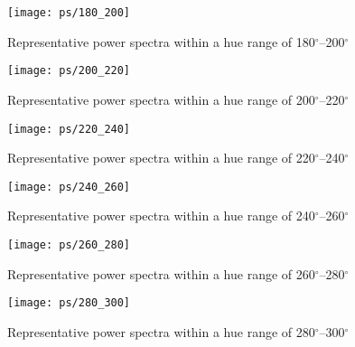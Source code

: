 \begin{figure}[p]
	{\vspace*{-0.5cm}\hspace*{-1.5cm}\texttt{[image: ps/180\_200]}}
	\caption[Power spectra with a hue of 180$^\circ$--200$^\circ$]{Representative power spectra within a hue range of 180$^\circ$--200$^\circ$}\label{fig:ps_180_200}
\end{figure}

\begin{figure}[p]
	{\vspace*{-0.5cm}\hspace*{-1.5cm}\texttt{[image: ps/200\_220]}}
	\caption[Power spectra with a hue of 200$^\circ$--220$^\circ$]{Representative power spectra within a hue range of 200$^\circ$--220$^\circ$}\label{fig:ps_200_220}
\end{figure}

\begin{figure}[p]
	{\vspace*{-0.5cm}\hspace*{-1.5cm}\texttt{[image: ps/220\_240]}}
	\caption[Power spectra with a hue of 220$^\circ$--240$^\circ$]{Representative power spectra within a hue range of 220$^\circ$--240$^\circ$}\label{fig:ps_220_240}
\end{figure}

\begin{figure}[p]
	{\vspace*{-0.5cm}\hspace*{-1.5cm}\texttt{[image: ps/240\_260]}}
	\caption[Power spectra with a hue of 240$^\circ$--260$^\circ$]{Representative power spectra within a hue range of 240$^\circ$--260$^\circ$}\label{fig:ps_240_260}
\end{figure}

\begin{figure}[p]
	{\vspace*{-0.5cm}\hspace*{-1.5cm}\texttt{[image: ps/260\_280]}}
	\caption[Power spectra with a hue of 260$^\circ$--280$^\circ$]{Representative power spectra within a hue range of 260$^\circ$--280$^\circ$}\label{fig:ps_260_280}
\end{figure}

\begin{figure}[p]
	{\vspace*{-0.5cm}\hspace*{-1.5cm}\texttt{[image: ps/280\_300]}}
	\caption[Power spectra with a hue of 280$^\circ$--300$^\circ$]{Representative power spectra within a hue range of 280$^\circ$--300$^\circ$}\label{fig:ps_280_300}
\end{figure}

